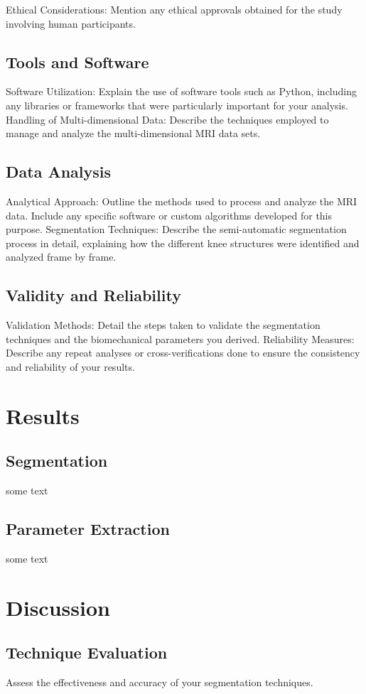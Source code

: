 \documentclass{micro-econ-thesis}
\begin{document}
Ethical Considerations: Mention any ethical approvals obtained for the study involving human participants.
\subsection{Tools and Software}
Software Utilization: Explain the use of software tools such as Python, including any libraries or frameworks that were particularly important for your analysis.
Handling of Multi-dimensional Data: Describe the techniques employed to manage and analyze the multi-dimensional MRI data sets.
\subsection{Data Analysis}
Analytical Approach: Outline the methods used to process and analyze the MRI data. Include any specific software or custom algorithms developed for this purpose.
Segmentation Techniques: Describe the semi-automatic segmentation process in detail, explaining how the different knee structures were identified and analyzed frame by frame.


\subsection{Validity and Reliability}
Validation Methods: Detail the steps taken to validate the segmentation techniques and the biomechanical parameters you derived.
Reliability Measures: Describe any repeat analyses or cross-verifications done to ensure the consistency and reliability of your results.

\section{Results}
\label{sec:yetanother}

\subsection{Segmentation}
\label{subsec:last}
some text 

\subsection{Parameter Extraction}
some text 

\section{Discussion}
\subsection{Technique Evaluation}
Assess the effectiveness and accuracy of your segmentation techniques. 
\end{document}
